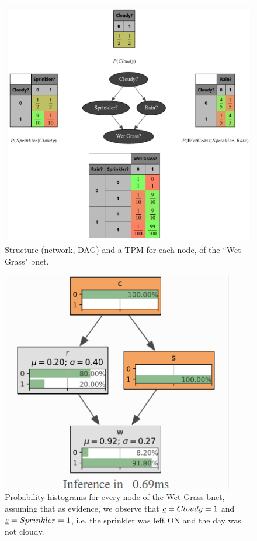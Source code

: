 \begin{figure}[h!]
\centering
\includegraphics[width=5in]
{bnet-apps/wet-grass-bnet}
\caption{Structure (network, DAG) and a TPM for each node, of the ``Wet Grass" 
bnet.}
\label{fig-wet-grass-bnet}
\end{figure}

\begin{figure}[h!]
\centering
\includegraphics[width=4in]
{bnet-apps/wet-grass-evidence}
\caption{Probability histograms for every node of the Wet Grass bnet,
assuming that as evidence, we observe that ${\underline{c}}=Cloudy=1$ and ${\underline{s}}=Sprinkler=1$, i.e. the sprinkler was left ON and the day was not cloudy.}
\label{fig-wet-grass-evidence}
\end{figure}


